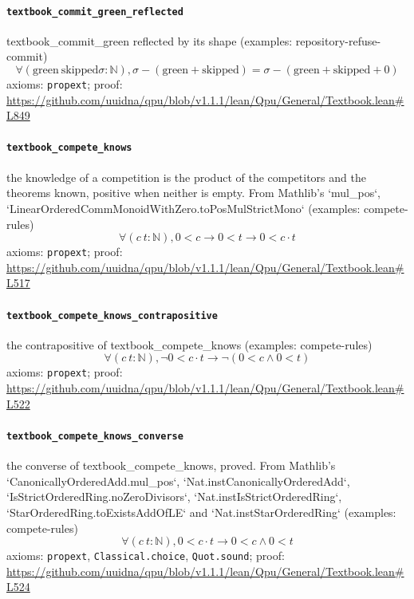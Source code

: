 \documentclass[11pt]{article}
\begin{document}
\paragraph{\texttt{textbook\_commit\_green\_reflected}}
textbook\_commit\_green reflected by its shape (examples: repository-refuse-commit)
\[ \forall (\mathrm{green}\ \mathrm{skipped} \sigma : \mathbb{N}), \sigma - (\mathrm{green} + \mathrm{skipped}) = \sigma - (\mathrm{green} + \mathrm{skipped} + 0) \]
\noindent axioms: \texttt{propext}; proof: \url{https://github.com/uuidna/qpu/blob/v1.1.1/lean/Qpu/General/Textbook.lean\#L849}

\paragraph{\texttt{textbook\_compete\_knows}}
the knowledge of a competition is the product of the competitors and the theorems known, positive when neither is empty. From Mathlib's `mul\_pos`, `LinearOrderedCommMonoidWithZero.toPosMulStrictMono` (examples: compete-rules)
\[ \forall (c\ t : \mathbb{N}), 0 < c \to 0 < t \to 0 < c \cdot t \]
\noindent axioms: \texttt{propext}; proof: \url{https://github.com/uuidna/qpu/blob/v1.1.1/lean/Qpu/General/Textbook.lean\#L517}

\paragraph{\texttt{textbook\_compete\_knows\_contrapositive}}
the contrapositive of textbook\_compete\_knows (examples: compete-rules)
\[ \forall (c\ t : \mathbb{N}), \neg 0 < c \cdot t \to \neg (0 < c \land 0 < t) \]
\noindent axioms: \texttt{propext}; proof: \url{https://github.com/uuidna/qpu/blob/v1.1.1/lean/Qpu/General/Textbook.lean\#L522}

\paragraph{\texttt{textbook\_compete\_knows\_converse}}
the converse of textbook\_compete\_knows, proved. From Mathlib's `CanonicallyOrderedAdd.mul\_pos`, `Nat.instCanonicallyOrderedAdd`, `IsStrictOrderedRing.noZeroDivisors`, `Nat.instIsStrictOrderedRing`, `StarOrderedRing.toExistsAddOfLE` and `Nat.instStarOrderedRing` (examples: compete-rules)
\[ \forall (c\ t : \mathbb{N}), 0 < c \cdot t \to 0 < c \land 0 < t \]
\noindent axioms: \texttt{propext}, \texttt{Classical.choice}, \texttt{Quot.sound}; proof: \url{https://github.com/uuidna/qpu/blob/v1.1.1/lean/Qpu/General/Textbook.lean\#L524}
\end{document}
